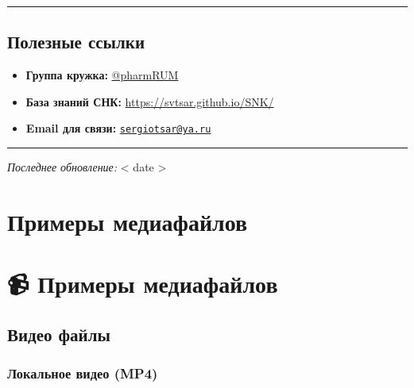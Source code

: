 \documentclass[
  russian,
  12pt,
  a4paper,
]{article}
\providecommand{\tightlist}{%
  \setlength{\itemsep}{0pt}\setlength{\parskip}{0pt}}
\begin{document}
\begin{center}\rule{0.5\linewidth}{0.5pt}\end{center}

\section{Полезные
ссылки}\label{ux43fux43eux43bux435ux437ux43dux44bux435-ux441ux441ux44bux43bux43aux438}

\begin{itemize}
\tightlist
\item
  \textbf{Группа кружка:} \href{https://t.me/pharmRUM}{@pharmRUM}
\item
  \textbf{База знаний СНК:} \url{https://svtsar.github.io/SNK/}
\item
  \textbf{Email для связи:}
  \href{mailto:sergiotsar@ya.ru}{\nolinkurl{sergiotsar@ya.ru}}
\end{itemize}

\begin{center}\rule{0.5\linewidth}{0.5pt}\end{center}

\emph{Последнее обновление:} {{< date >}}


\chapter{Примеры
медиафайлов}\label{ux43fux440ux438ux43cux435ux440ux44b-ux43cux435ux434ux438ux430ux444ux430ux439ux43bux43eux432}


\chapter{📹 Примеры
медиафайлов}\label{ux43fux440ux438ux43cux435ux440ux44b-ux43cux435ux434ux438ux430ux444ux430ux439ux43bux43eux432-1}

\section{Видео
файлы}\label{ux432ux438ux434ux435ux43e-ux444ux430ux439ux43bux44b}

\subsection{Локальное видео
(MP4)}\label{ux43bux43eux43aux430ux43bux44cux43dux43eux435-ux432ux438ux434ux435ux43e-mp4}
\end{document}
